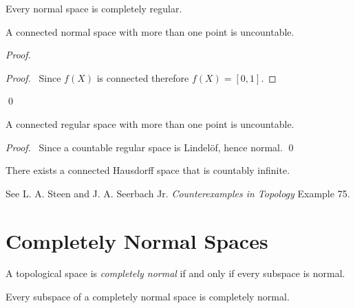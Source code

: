 \begin{corollary}
    Every normal space is completely regular.
\end{corollary}

\begin{proposition}
    A connected normal space with more than one point is uncountable.
\end{proposition}

\begin{proof}
    \pf
    \begin{proof}
        \pf\ Since $f(X)$ is connected therefore $f(X) = [0,1]$.
    \end{proof}
    \qed
\end{proof}

\begin{corollary}
    A connected regular space with more than one point is uncountable.
\end{corollary}

\begin{proof}
    \pf\ Since a countable regular space is Lindel\"{o}f, hence normal. \qed
\end{proof}

\begin{example}
    There exists a connected Hausdorff space that is countably infinite.

    See L. A. Steen and J. A. Seerbach Jr. \emph{Counterexamples in
    Topology} Example 75.
\end{example}

\section{Completely Normal Spaces}

\begin{definition}
    A topological space is \emph{completely normal} if and only if every subspace is
    normal.
\end{definition}

\begin{proposition}
    Every subspace of a completely normal space is completely normal.
\end{proposition}

